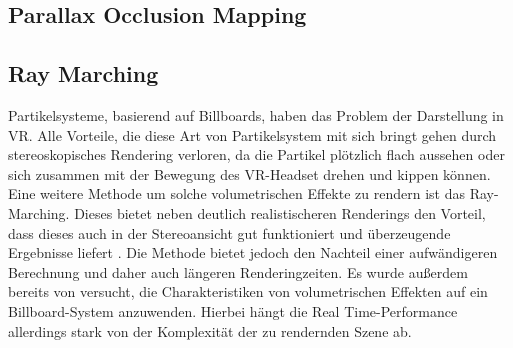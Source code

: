 \subsection{Parallax Occlusion Mapping}


\subsection{Ray Marching}
Partikelsysteme, basierend auf Billboards, haben das Problem der Darstellung in VR. Alle Vorteile, die diese Art von 
Partikelsystem mit sich bringt gehen durch stereoskopisches Rendering verloren, da die Partikel plötzlich flach aussehen 
oder sich zusammen mit der Bewegung des VR-Headset drehen und kippen können. Eine weitere Methode um solche volumetrischen 
Effekte zu rendern ist das Ray-Marching. Dieses bietet neben deutlich realistischeren Renderings den Vorteil, dass dieses 
auch in der Stereoansicht gut funktioniert und überzeugende Ergebnisse liefert \parencite{Wald2006}. Die Methode bietet 
jedoch den Nachteil einer aufwändigeren Berechnung und daher auch längeren Renderingzeiten. Es wurde außerdem bereits von 
\textcite{Zhang2020} versucht, die Charakteristiken von volumetrischen Effekten auf ein Billboard-System anzuwenden. 
Hierbei hängt die Real Time-Performance allerdings stark von der Komplexität der zu rendernden Szene ab.